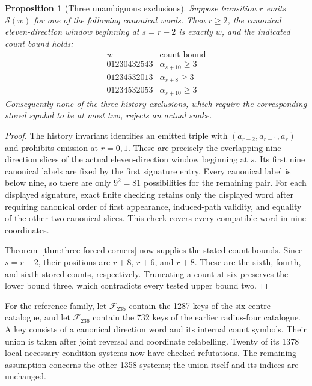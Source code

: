 \documentclass[11pt,a4paper]{article}
\newtheorem{proposition}[theorem]{Proposition}
\theoremstyle{definition}
\theoremstyle{remark}
\begin{document}
\begin{proposition}[Three unambiguous exclusions]\label{prop:history-exclusion-retention}
Suppose transition $r$ emits $\mathcal S(w)$ for one of the following
canonical words. Then $r\ge2$, the canonical eleven-direction window
beginning at $s=r-2$ is exactly $w$, and the indicated count bound holds:
\[
\begin{array}{c|c}
w&\text{count bound}\\\hline
01230432543&\alpha_{s+10}\ge3\\
01234532013&\alpha_{s+8}\ge3\\
01234532053&\alpha_{s+10}\ge3
\end{array}
\]
Consequently none of the three history exclusions, which require the
corresponding stored symbol to be at most two, rejects an actual snake.
\end{proposition}
\begin{proof}
The history invariant identifies an emitted triple with
$(a_{r-2},a_{r-1},a_r)$ and prohibits emission at $r=0,1$. These are precisely
the overlapping nine-direction slices of the actual eleven-direction
window beginning at $s$. Its first nine canonical labels are fixed by the
first signature entry. Every canonical label is below nine, so there are
only $9^2=81$ possibilities for the remaining pair. For each displayed
signature, exact finite checking retains only the displayed word after
requiring canonical order of first appearance, induced-path validity,
and equality of the other two canonical slices. This check covers every
compatible word in nine coordinates.

Theorem~\ref{thm:three-forced-corners} now supplies the stated count bounds.
Since $s=r-2$, their positions are $r+8$, $r+6$, and $r+8$. These are the
sixth, fourth, and sixth stored counts, respectively. Truncating a count
at six preserves the lower bound three, which contradicts every tested
upper bound two.
\end{proof}

For the reference family, let $\mathcal F_{235}$ contain the 1287 keys of
the six-centre catalogue, and let $\mathcal F_{236}$ contain the 732 keys
of the earlier radius-four catalogue. A key consists of a canonical direction
word and its internal count symbols. Their union is taken after joint
reversal and coordinate relabelling. Twenty of its 1378 local necessary-condition systems now have checked
refutations. The remaining assumption concerns the other 1358 systems;
the union itself and its indices are unchanged.
\end{document}
